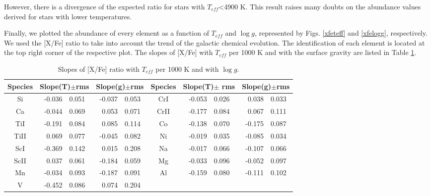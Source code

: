 \documentclass[dvips,12pt,a4paper]{report}
\begin{document}
{{However, there is a divergence of the expected ratio for stars with $T_{eff}$<4900 K. This result raises many doubts on the abundance values derived for stars with lower temperatures.

Finally, we plotted the abundance of every element as a function of $T_{eff}$ and $\log g$, represented by Figs. \ref{xfeteff} and  \ref{xfelogg}, respectively. We used the [X/Fe] ratio to take into account the trend of the galactic chemical evolution. The identification of each element is located at the top right corner of the respective plot. The slopes of [X/Fe] with $T_{eff}$ per 1000 K and with the surface gravity are listed in Table \ref{slopes}.

\begin{table}[h]\scriptsize
\centering
\caption[Slopes of metallicity in function of $T{eff}$ per 1000 K ]{Slopes of [X/Fe] ratio with $T_{eff}$ per 1000 K and with $\log g$.}
\begin{tabular}{ c r@{$\pm$}l r@{$\pm$}l | c r@{$\pm$}l r@{$\pm$}l}
\hline
\hline
Species & \multicolumn {2}{c}{Slope(T)$\pm$rms} & \multicolumn {2}{c}{Slope(g)$\pm$rms} & Species & \multicolumn {2}{c}{Slope(T)$\pm$ rms} & \multicolumn {2}{c}{Slope(g)$\pm$rms} \\
\hline
Si & -0.036 & 0.051 & -0.037	& 0.053 & CrI & -0.053 &   0.026 & 0.038 & 0.033 \\
Ca &  -0.044 &    0.069 & 0.053 & 0.071 & CrII &  -0.177 & 0.084 & 0.067 & 0.111 \\
TiI & -0.191 & 0.084 & 0.085	& 0.114 & Co & -0.138 &  0.070 & -0.175 & 0.087 \\
TiII &  0.069 & 0.077 & -0.045 & 0.082 &  Ni & -0.019 & 0.035 & -0.085 & 0.034 \\
ScI & -0.369 & 0.142 & 0.015 & 0.208	& Na &-0.017 &   0.066 & -0.107 & 0.066 \\
ScII &  0.037 & 0.061 & -0.184 & 0.059 & Mg & -0.033 & 0.096& -0.052 & 0.097 \\
Mn & -0.034  &  0.093  & -0.187 & 0.091 &  Al & -0.159  &    0.080 & -0.111 & 0.102 \\
V & -0.452 & 0.086 & 0.074 & 0.204 \\
\hline

\end{tabular}
\label {slopes}
\end{table}

}}
\end{document}
